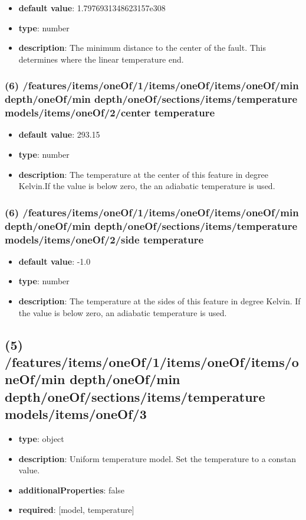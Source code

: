 \begin{itemize}[leftmargin=6em]\item {\bf default value}: 1.7976931348623157e308
\item {\bf type}: number
\item {\bf description}: The minimum distance to the center of the fault. This determines where the linear temperature end.
\end{itemize}\subsubsection{(6) /features/items/oneOf/1/items/oneOf/items/oneOf/min depth/oneOf/min depth/oneOf/sections/items/temperature models/items/oneOf/2/center temperature}
\begin{itemize}[leftmargin=6em]\item {\bf default value}: 293.15
\item {\bf type}: number
\item {\bf description}: The temperature at the center of this feature in degree Kelvin.If the value is below zero, the an adiabatic temperature is used.
\end{itemize}\subsubsection{(6) /features/items/oneOf/1/items/oneOf/items/oneOf/min depth/oneOf/min depth/oneOf/sections/items/temperature models/items/oneOf/2/side temperature}
\begin{itemize}[leftmargin=6em]\item {\bf default value}: -1.0
\item {\bf type}: number
\item {\bf description}: The temperature at the sides of this feature in degree Kelvin. If the value is below zero, an adiabatic temperature is used.
\end{itemize}\subsection{(5) /features/items/oneOf/1/items/oneOf/items/oneOf/min depth/oneOf/min depth/oneOf/sections/items/temperature models/items/oneOf/3}
\begin{itemize}[leftmargin=5em]\item {\bf type}: object
\item {\bf description}: Uniform temperature model. Set the temperature to a constan value.
\item {\bf additionalProperties}: false
\item {\bf required}: [model, temperature]\end{itemize}
